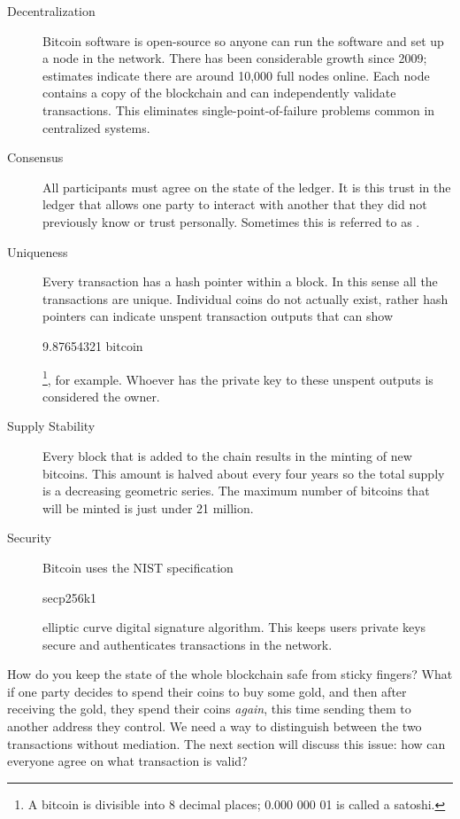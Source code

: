 \begin{description}
	\item [Decentralization] Bitcoin software is open-source so anyone can run the software and set up a node in the network. There has been considerable growth since 2009; estimates indicate there are around 10,000 full nodes online. Each node contains a copy of the blockchain and can independently validate transactions. This eliminates single-point-of-failure problems common in centralized systems.
	\item[Consensus] All participants must agree on the state of the ledger. It is this trust in the ledger that allows one party to interact with another that they did not previously know or trust personally. Sometimes this is referred to as .
	\item [Uniqueness] Every transaction has a hash pointer within a block. In this sense all the transactions are unique. Individual coins do not actually exist, rather hash pointers can indicate unspent transaction outputs that can show \begin{code}9.87654321 bitcoin\end{code}\footnote{A bitcoin is divisible into 8 decimal places; 0.000 000 01 is called a satoshi.}, for example. Whoever has the private key to these unspent outputs is considered the owner.
	\item [Supply Stability] Every block that is added to the chain results in the minting of new bitcoins. This amount is halved about every four years so the total supply is a decreasing geometric series. The maximum number of bitcoins that will be minted is just under 21 million.
	\item [Security] Bitcoin uses the NIST specification \begin{code}secp256k1\end{code} elliptic curve digital signature algorithm. This keeps users private keys secure and authenticates transactions in the network.
 
\end{description}
How do you keep the state of the whole blockchain safe from sticky fingers? What if one party decides to spend their coins to buy some gold, and then after receiving the gold, they spend their coins \textit{again}, this time sending them to another address they control. We need a way to distinguish between the two transactions without mediation. The next section will discuss this issue: how can everyone agree on what transaction is valid?

